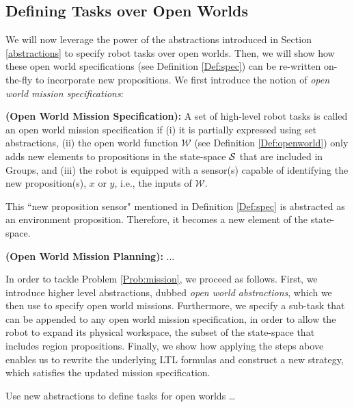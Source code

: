\subsection{Defining Tasks over Open Worlds}

We will now leverage the power of the abstractions introduced in Section \ref{abstractions} to specify robot tasks over open worlds. Then, we will show how these open world specifications (see Definition \ref{Def:spec}) can be re-written on-the-fly to incorporate new propositions. We first introduce the notion of \emph{open world mission specifications}:

\begin{myDefinition}\label{Def:spec}
	\textbf{(Open World Mission Specification):} A set of high-level robot tasks is called an open world mission specification if 
	(i) it is partially expressed using set abstractions, 
	(ii) the open world function $\mathcal{W}$ (see Definition \ref{Def:openworld}) only adds new elements to propositions in the state-space $\mathcal{S}$ that are included in Groups, and 
	(iii) the robot is equipped with a sensor(s) capable of identifying the  new proposition(s), $\mathit{x}$ or $\mathit{y}$, i.e., the inputs of $\mathcal{W}$.
	\end{myDefinition} 
This ``new proposition sensor" mentioned in Definition \ref{Def:spec} is abstracted as an environment proposition. Therefore, it becomes a new element of the state-space.

\begin{myProblem}\label{Prob:mission}
	\textbf{(Open World Mission Planning):}
	...
\end{myProblem}

In order to tackle Problem \ref{Prob:mission}, we proceed as follows. First, we introduce higher level abstractions, dubbed \emph{open world abstractions}, %
which we then use to specify open world missions. Furthermore, we specify a sub-task that can be appended to any open world mission specification, in order to allow the robot to expand its physical workspace, the subset of the state-space that includes region propositions. Finally, we  show how applying the steps above enables us to rewrite the underlying LTL formulas and construct a new strategy, which satisfies the updated mission specification. 

Use new abstractions to define tasks for open worlds \ldots

